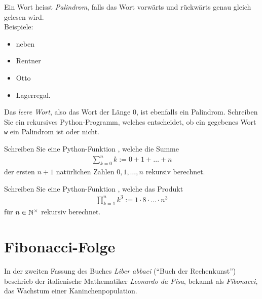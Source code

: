 \begin{myexercise}\label{myexercise:0377}
Ein Wort heisst \textit{Palindrom}, falls das Wort vorwärts und rückwärts genau gleich gelesen wird.\\
Beispiele:
\begin{itemize}
    \item neben
    \item Rentner
    \item Otto
    \item Lagerregal.
\end{itemize}
Das \textit{leere Wort}, also das Wort der Länge $0$, ist ebenfalls ein Palindrom. Schreiben Sie ein rekursives Python-Programm, welches entscheidet, ob ein gegebenes Wort \verb|w| ein Palindrom ist oder nicht.
\end{myexercise}

\begin{myexercise}\label{myexercise:0308}
Schreiben Sie eine Python-Funktion , welche die Summe
\begin{align*}
    \sum_{k=0}^n k := 0 + 1 + \ldots + n
\end{align*}
der ersten $n+1$ natürlichen Zahlen $0,1,\ldots ,n$ rekursiv berechnet.
\end{myexercise}

\begin{myexercise}\label{myexercise:0311}
Schreiben Sie eine Python-Funktion , welche das Produkt
\begin{align*}
    \prod_{k=1}^n k^3 := 1 \cdot 8 \cdot \ldots \cdot n^3
\end{align*}
für $n\in\mathbb{N}^{\times}$ rekursiv berechnet.
\end{myexercise}

\clearpage

\section{Fibonacci-Folge}
In der zweiten Fassung des Buches \textit{Liber abbaci} (\enquote{Buch der Rechenkunst}) beschrieb der italienische Mathematiker \textit{Leonardo da Pisa}, bekannt als \textit{Fibonacci}, das Wachstum einer Kaninchenpopulation.

